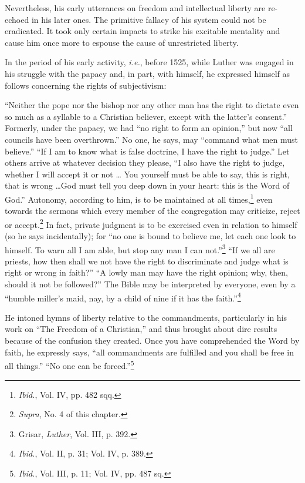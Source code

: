 Nevertheless, his early utterances on freedom and intellectual
liberty are re-echoed in his later ones. The primitive fallacy of his
system could not be eradicated. It took only certain impacts to strike
his excitable mentality and cause him once more to espouse the cause
of unrestricted liberty.

In the period of his early activity, \textit{i.e.}, before 1525, while Luther
was engaged in his struggle with the papacy and, in part, with himself,
he expressed himself as follows concerning the rights of subjectivism:

“Neither the pope nor the bishop nor any other man has the right to
dictate even so much as a syllable to a Christian believer, except with the
latter’s consent.” Formerly, under the papacy, we had “no right to form
an opinion,” but now “all councils have been overthrown.” No one, he says,
may “command what men must believe.” “If I am to know what is false
doctrine, I have the right to judge.” Let others arrive at whatever decision they
please, “I also have the right to judge, whether I will accept it or not \dots
You yourself must be able to say, this is right, that is wrong \dots God
must tell you deep down in your heart: this is the Word of God.” Autonomy,
according to him, is to be maintained at all times,\footnote{\textit{Ibid.}, Vol. IV, pp. 482 sqq.}
even towards the
sermons which every member of the congregation may criticize, reject or
accept.\footnote{\textit{Supra}, No. 4 of this chapter.}
In fact, private judgment is to be exercised even in relation to
himself (so he says incidentally); for “no one is bound to believe me, let
each one look to himself. To warn all I am able, but stop any man I can
not.”\footnote{Grisar, \textit{Luther}, Vol. III, p. 392.}
“If we all are priests, how then shall we not have the right to
discriminate and judge what is right or wrong in faith?” “A lowly man
may have the right opinion; why, then, should it not be followed?” The
Bible may be interpreted by everyone, even by a “humble miller’s maid, nay,
by a child of nine if it has the faith.”\footnote{\textit{Ibid.}, Vol. II, p. 31; Vol. IV, p. 389.}

He intoned hymns of liberty relative to the commandments, particularly
in his work on “The Freedom of a Christian,” and thus brought about dire
results because of the confusion they created. Once you have comprehended
the Word by faith, he expressly says, “all commandments are fulfilled and
you shall be free in all things.” “No one can be forced.”\footnote
{\textit{Ibid.}, Vol. III, p. 11; Vol. IV, pp. 487 sq.}

